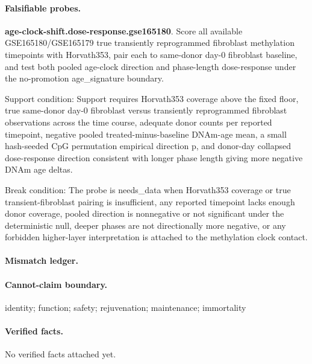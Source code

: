 \paragraph{Falsifiable probes.}
\textbf{age-clock-shift.dose-response.gse165180}. Score all available GSE165180/GSE165179 true transiently reprogrammed fibroblast methylation timepoints with Horvath353, pair each to same-donor day-0 fibroblast baseline, and test both pooled age-clock direction and phase-length dose-response under the no-promotion age\_signature boundary.

Support condition: Support requires Horvath353 coverage above the fixed floor, true same-donor day-0 fibroblast versus transiently reprogrammed fibroblast observations across the time course, adequate donor counts per reported timepoint, negative pooled treated-minus-baseline DNAm-age mean, a small hash-seeded CpG permutation empirical direction p, and donor-day collapsed dose-response direction consistent with longer phase length giving more negative DNAm age deltas.

Break condition: The probe is needs\_data when Horvath353 coverage or true transient-fibroblast pairing is insufficient, any reported timepoint lacks enough donor coverage, pooled direction is nonnegative or not significant under the deterministic null, deeper phases are not directionally more negative, or any forbidden higher-layer interpretation is attached to the methylation clock contact.

\paragraph{Mismatch ledger.}
\paragraph{Cannot-claim boundary.} identity; function; safety; rejuvenation; maintenance; immortality

\paragraph{Verified facts.}
No verified facts attached yet.
